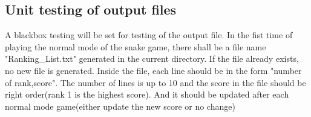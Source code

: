 \documentclass[12pt, titlepage]{article}
\begin{document}
\subsection{Unit testing of output files}		
A blackbox testing will be set for testing of the output file. In the fist time of playing the normal mode of the snake game, there shall be a file name "Ranking\_List.txt" generated in the current directory. If the file already exists, no new file is generated. Inside the file, each line should be in the form "number of rank,score".
    The number of lines is up to 10 and the score in the file should be right order(rank 1 is the highest score). And it should be updated after each normal mode game(either update the new score or no change)







\newpage
\end{document}
